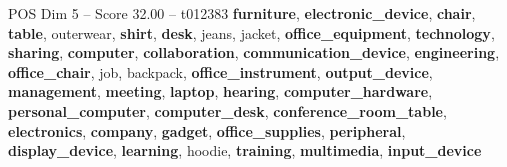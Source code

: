 \begin{textsample}{POS Dim 5 – Score 32.00 – t012383}  \label{ex:f5_pos_014}
\textbf{furniture}, \textbf{electronic\_device}, \textbf{chair}, \textbf{table}, outerwear, \textbf{shirt}, \textbf{desk}, jeans, jacket, \textbf{office\_equipment}, \textbf{technology}, \textbf{sharing}, \textbf{computer}, \textbf{collaboration}, \textbf{communication\_device}, \textbf{engineering}, \textbf{office\_chair}, job, backpack, \textbf{office\_instrument}, \textbf{output\_device}, \textbf{management}, \textbf{meeting}, \textbf{laptop}, \textbf{hearing}, \textbf{computer\_hardware}, \textbf{personal\_computer}, \textbf{computer\_desk}, \textbf{conference\_room\_table}, \textbf{electronics}, \textbf{company}, \textbf{gadget}, \textbf{office\_supplies}, \textbf{peripheral}, \textbf{display\_device}, \textbf{learning}, hoodie, \textbf{training}, \textbf{multimedia}, \textbf{input\_device}

\end{textsample}
